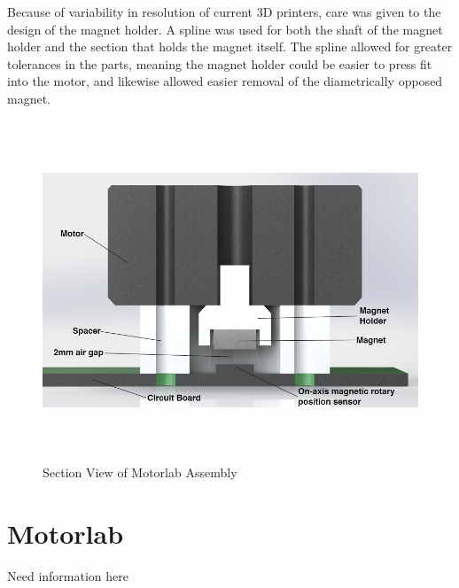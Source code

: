 Because of variability in resolution of current 3D printers, care was given to the design of the magnet holder. A spline was used for both the shaft of the magnet holder and the section that holds the magnet itself. The spline allowed for greater tolerances in the parts, meaning the magnet holder could be easier to press fit into the motor, and likewise allowed easier removal of the diametrically opposed magnet.

\begin{figure}[htb]%

    \includegraphics[height=4in]{figures/section_view_motorlab_assembly.png}

    \caption[Section View of Motorlab Assembly]{Section View of Motorlab Assembly}

    \label{section_view_motorlab}
\end{figure}


\section{Motorlab}
\label{makereference2.2} 

Need information here